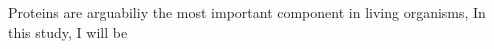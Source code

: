 Proteins are arguabiliy the most important component in living organisms,  In this study, I will be 